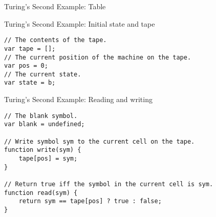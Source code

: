 \begin{frame}{Turing's Second Example: Table}
  \begin{table}
  \end{table}
\end{frame}


\begin{frame}[fragile]{Turing's Second Example: Initial state and tape}
\begin{verbatim}
// The contents of the tape.
var tape = [];
// The current position of the machine on the tape.
var pos = 0;
// The current state.
var state = b;
\end{verbatim}
\end{frame}

\begin{frame}[fragile]{Turing's Second Example: Reading and writing}
\begin{verbatim}
// The blank symbol.
var blank = undefined;

// Write symbol sym to the current cell on the tape.
function write(sym) {
	tape[pos] = sym;
}

// Return true iff the symbol in the current cell is sym.
function read(sym) {
	return sym == tape[pos] ? true : false;
}
\end{verbatim}
\end{frame}

